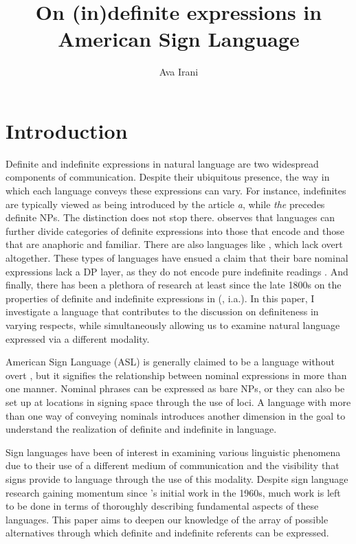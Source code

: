 \documentclass[output=paper,
modfonts
]{langscibook}
\title{On (in)definite expressions in American Sign Language}
\author{%
Ava Irani\affiliation{University of Pennsylvania}
}
\begin{document}
\maketitle
\section{Introduction} 

Definite and indefinite expressions in natural language are two widespread components of communication. Despite their ubiquitous presence, the way in which each language conveys these expressions can vary. For instance,  indefinites are typically viewed as being introduced by the article \textit{a}, while \textit{the} precedes definite NPs. The distinction does not stop there. \citet{Schwarz2009} observes that languages can further divide categories of definite expressions into those that encode  and those that are anaphoric and familiar. There are also languages like , which lack overt  altogether. These types of languages have ensued a claim that their bare nominal expressions lack a DP layer, as they do not encode pure indefinite readings \citep{Dayal2004}. And finally, there has been a plethora of research at least since the late 1800s on the properties of definite and indefinite expressions in  (\citealt{Frege1892, Russell1905, Kamp1981, Heim1982}, i.a.). In this paper, I investigate a language that contributes to the discussion on definiteness in varying respects, while simultaneously allowing us to examine natural language expressed via a different modality. 

American Sign Language (ASL) is generally claimed to be a language without overt , but it signifies the relationship between nominal expressions in more than one manner. Nominal phrases can be expressed as bare NPs, or they can also be set up at locations in signing space through the use of loci. A language with more than one way of conveying nominals introduces another dimension in the goal to understand the realization of definite and indefinite  in language. 

Sign languages have been of interest in examining various linguistic phenomena due to their use of a different medium of communication and the visibility that signs provide to language through the use of this modality. Despite sign language research gaining momentum since \citeauthor{Stokoe1969}'s initial work in the 1960s, much work is left to be done in terms of thoroughly describing fundamental aspects of these languages. This paper aims to deepen our knowledge of the array of possible alternatives through which definite and indefinite referents can be expressed.
\end{document}
